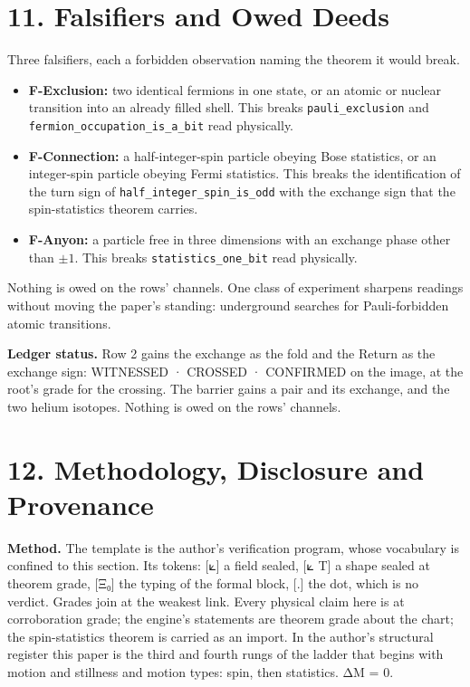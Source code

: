 \documentclass[10pt]{article}
\providecommand{\tightlist}{\setlength{\itemsep}{0pt}\setlength{\parskip}{0pt}}
\begin{document}
\hypertarget{falsifiers-and-owed-deeds}{%
\section{11. Falsifiers and Owed
Deeds}\label{falsifiers-and-owed-deeds}}

Three falsifiers, each a forbidden observation naming the theorem it
would break.

\begin{itemize}
\tightlist
\item
  \textbf{F-Exclusion:} two identical fermions in one state, or an
  atomic or nuclear transition into an already filled shell. This breaks
  \texttt{pauli\_exclusion} and \texttt{fermion\_occupation\_is\_a\_bit}
  read physically.
\item
  \textbf{F-Connection:} a half-integer-spin particle obeying Bose
  statistics, or an integer-spin particle obeying Fermi statistics. This
  breaks the identification of the turn sign of
  \texttt{half\_integer\_spin\_is\_odd} with the exchange sign that the
  spin-statistics theorem carries.
\item
  \textbf{F-Anyon:} a particle free in three dimensions with an exchange
  phase other than \(\pm1\). This breaks \texttt{statistics\_one\_bit}
  read physically.
\end{itemize}

Nothing is owed on the rows' channels. One class of experiment sharpens
readings without moving the paper's standing: underground searches for
Pauli-forbidden atomic transitions.

\textbf{Ledger status.} Row 2 gains the exchange as the fold and the
Return as the exchange sign: WITNESSED · CROSSED · CONFIRMED on the
image, at the root's grade for the crossing. The barrier gains a pair
and its exchange, and the two helium isotopes. Nothing is owed on the
rows' channels.

\hypertarget{methodology-disclosure-and-provenance}{%
\section{12. Methodology, Disclosure and
Provenance}\label{methodology-disclosure-and-provenance}}

\textbf{Method.} The template is the author's verification program,
whose vocabulary is confined to this section. Its tokens: {[}⟀{]} a
field sealed, {[}⟀ T{]} a shape sealed at theorem grade, {[}Ξ₀{]} the
typing of the formal block, {[}.{]} the dot, which is no verdict. Grades
join at the weakest link. Every physical claim here is at corroboration
grade; the engine's statements are theorem grade about the chart; the
spin-statistics theorem is carried as an import. In the author's
structural register this paper is the third and fourth rungs of the
ladder that begins with motion and stillness and motion types: spin,
then statistics. ΔM = 0.
\end{document}
